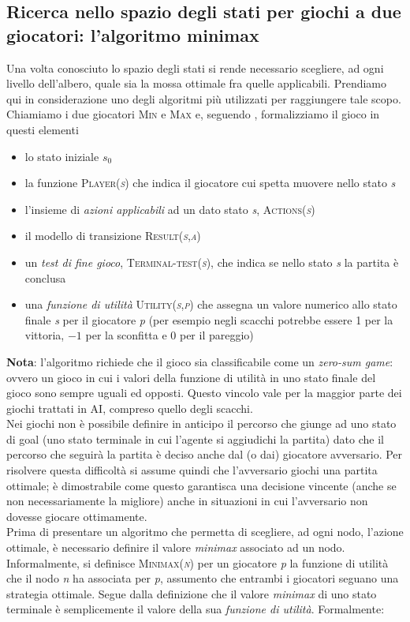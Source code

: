 \subsection{Ricerca nello spazio degli stati per giochi a due giocatori: l'algoritmo minimax}
Una volta conosciuto lo spazio degli stati si rende necessario scegliere, ad ogni livello dell'albero, quale sia la mossa ottimale fra quelle applicabili.
Prendiamo qui in considerazione uno degli algoritmi più utilizzati per raggiungere tale scopo.\\
Chiamiamo i due giocatori \textsc{Min} e \textsc{Max} e, seguendo \cite{randw}, formalizziamo il gioco in questi elementi
\begin{itemize}
   \item lo stato iniziale \emph{$s_0$} 
   \item la funzione \textsc{Player(\emph{s})} che indica il giocatore cui spetta muovere nello stato \emph{s}
   \item l'insieme di \emph{azioni applicabili} ad un dato stato \emph{s}, \textsc{Actions(\emph{s})}
   \item il modello di transizione \textsc{Result(\emph{s},\emph{a})}
   \item un \emph{test di fine gioco}, \textsc{Terminal-test(\emph{s})}, che indica se nello stato  \emph{s} la partita è conclusa
   \item una \emph{funzione di utilità} \textsc{Utility(\emph{s},\emph{p})} che assegna un valore numerico allo stato finale \emph{s} per il giocatore \emph{p} (per esempio negli scacchi potrebbe essere 1 per la vittoria, $-1$ per la sconfitta e 0 per il pareggio)
\end{itemize}
\vspace{.7cm}
\textbf{Nota}: l'algoritmo richiede che il gioco sia classificabile come un \emph{zero-sum game}: ovvero un gioco in cui i valori della funzione di utilità in uno stato finale del gioco sono sempre uguali ed opposti.
Questo vincolo vale per la maggior parte dei giochi trattati in AI, compreso quello degli scacchi.\vspace{.7cm}\\
Nei giochi non è possibile definire in anticipo il percorso che giunge ad uno stato di goal (uno stato terminale in cui l'agente si aggiudichi la partita) dato che il percorso che seguirà la partita è deciso anche dal (o dai) giocatore avversario.
Per risolvere questa difficoltà si assume quindi che l'avversario giochi una partita ottimale; è dimostrabile come questo garantisca una decisione vincente (anche se non necessariamente la migliore) anche in situazioni in cui l'avversario non dovesse giocare ottimamente.\\
Prima di presentare un algoritmo che permetta di scegliere, ad ogni nodo, l'azione ottimale, è necessario definire il valore \emph{minimax} associato ad un nodo.
Informalmente, si definisce \textsc{Minimax(\emph{n})} per un giocatore \emph{p }la funzione di utilità che il nodo \emph{n} ha associata per \emph{p}, assumento che entrambi i giocatori seguano una strategia ottimale.
Segue dalla definizione che il valore \emph{minimax} di uno stato terminale è semplicemente il valore della sua \emph{funzione di utilità}.
Formalmente:

